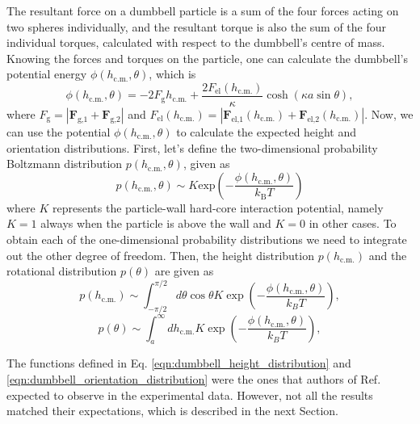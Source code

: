 \documentclass{master_thesis}
\begin{document}
The resultant force on a dumbbell particle is a sum of the four forces acting on two spheres individually, and the resultant torque is also the sum of the four individual torques, calculated with respect to the dumbbell's centre of mass. Knowing the forces and torques on the particle, one can calculate the dumbbell's potential energy $\phi(h_{\textrm{c.m.}}, \theta)$, which is 
\begin{equation}
    \phi(h_{\textrm{c.m.}}, \theta) = -2 F_\textrm{g} h_{\textrm{c.m.}} + \frac{2 F_\textrm{el}(h_{\textrm{c.m.}})}{\kappa} \cosh(\kappa a \sin \theta ),
\label{eqn:dumbbell_potential_energy}
\end{equation}
where $F_{\textrm{g}} = |\boldsymbol{F}_{\textrm{g,}1} + \boldsymbol{F}_{\textrm{g,}2}|$ and $F_{\textrm{el}}(h_{\textrm{c.m.}}) = |\boldsymbol{F}_{\textrm{el,}1}(h_{\textrm{c.m.}}) + \boldsymbol{F}_{\textrm{el,}2}(h_{\textrm{c.m.}})|$. Now, we can use the potential $\phi(h_{\textrm{c.m.}}, \theta)$ to calculate the expected height and orientation distributions. First, let's define the two-dimensional probability Boltzmann distribution $p(h_{\textrm{c.m.}}, \theta)$, given as
\begin{equation}
    p(h_{\textrm{c.m.}}, \theta) \sim K \textrm{exp}\left( -\frac{\phi(h_{\textrm{c.m.}}, \theta)}{k_{\textrm{B}}T} \right)
\end{equation}
where $K$ represents the particle-wall hard-core interaction potential, namely $K=1$ always when the particle is above the wall and $K=0$ in other cases. To obtain each of the one-dimensional probability distributions we need to integrate out the other degree of freedom. Then, the height distribution $p(h_{\textrm{c.m.}})$ and the rotational distribution $p(\theta)$ are given as
\begin{equation}
    p(h_{\textrm{c.m.}}) \sim \int_{-\pi/2}^{\pi/2} d\theta \cos\theta K \exp \left( -\frac{\phi(h_{\textrm{c.m.}}, \theta)}{k_B T} \right),
\label{eqn:dumbbell_height_distribution}
\end{equation}
\begin{equation}
    p(\theta) \sim \int_{a}^{\infty} dh_{\textrm{c.m.}} K \exp \left( -\frac{\phi(h_{\textrm{c.m.}}, \theta)}{k_B T} \right),
\label{eqn:dumbbell_orientation_distribution}
\end{equation}

The functions defined in Eq. \eqref{eqn:dumbbell_height_distribution} and \eqref{eqn:dumbbell_orientation_distribution} were the ones that authors of Ref. \cite{verweij2021} expected to observe in the experimental data. However, not all the results matched their expectations, which is described in the next Section.
\end{document}
